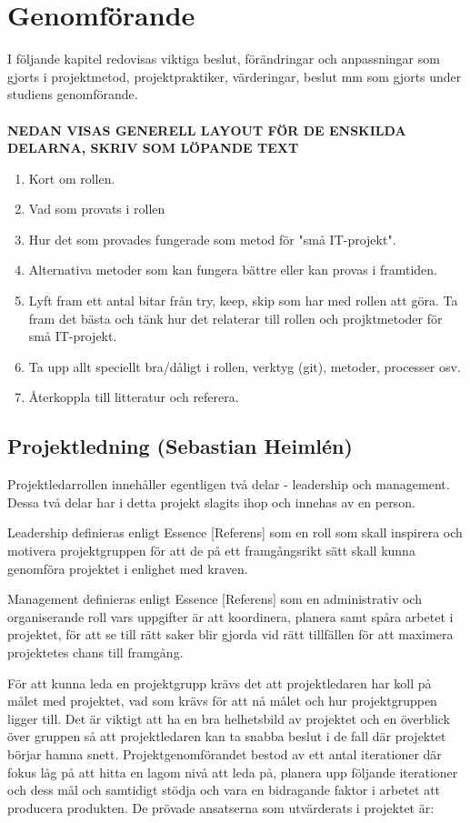 \documentclass[conference,a4paper]{IEEEtran}
\begin{document}
\section{Genomförande} \label{sec:genom}
I följande kapitel redovisas viktiga beslut, förändringar och anpassningar som gjorts i projektmetod, projektpraktiker, värderingar, beslut mm som gjorts under studiens genomförande.\\
\\
\textbf{NEDAN VISAS GENERELL LAYOUT FÖR DE ENSKILDA DELARNA, SKRIV SOM LÖPANDE TEXT}
\begin{enumerate}
\item Kort om rollen.
\item Vad som provats i rollen
\item Hur det som provades fungerade som metod för "små IT-projekt".
\item Alternativa metoder som kan fungera bättre eller kan provas i framtiden.
\item Lyft fram ett antal bitar från try, keep, skip som har med rollen att göra. Ta fram det bästa och tänk hur det relaterar till rollen och projktmetoder för små IT-projekt.
\item Ta upp allt speciellt bra/dåligt i rollen, verktyg (git), metoder, processer osv.
\item Återkoppla till litteratur och referera.
\end{enumerate}

\subsection{Projektledning (Sebastian Heimlén)}
Projektledarrollen innehåller egentligen två delar - leadership och management. Dessa två delar har i detta projekt slagits ihop och innehas av en person.

Leadership definieras enligt Essence [Referens] som en roll som skall inspirera och motivera projektgruppen för att de på ett framgångsrikt sätt skall kunna genomföra projektet i enlighet med kraven.

Management definieras enligt Essence [Referens] som en administrativ och organiserande roll vars uppgifter är att koordinera, planera samt spåra arbetet i projektet, för att se till rätt saker blir gjorda vid rätt tillfällen för att maximera projektetes chans till framgång.

För att kunna leda en projektgrupp krävs det att projektledaren har koll på målet med projektet, vad som krävs för att nå målet och hur projektgruppen ligger till. Det är viktigt att ha en bra helhetsbild av projektet och en överblick över gruppen så att projektledaren kan ta snabba beslut i de fall där projektet börjar hamna snett. Projektgenomförandet bestod av ett antal iterationer där fokus låg på att hitta en lagom nivå att leda på, planera upp följande iterationer och dess mål och samtidigt stödja och vara en bidragande faktor i arbetet att producera produkten. De prövade ansatserna som utvärderats i projektet är:
\end{document}
